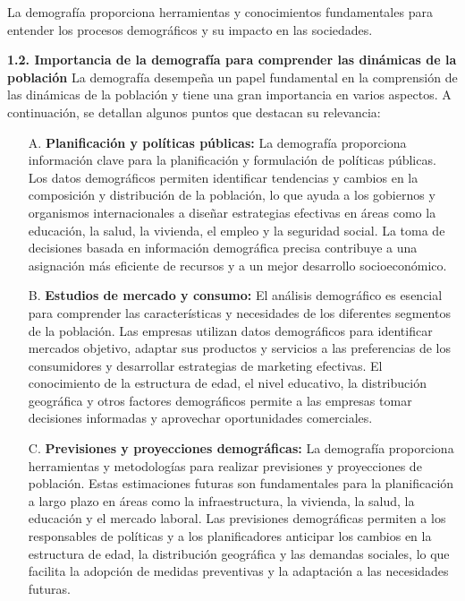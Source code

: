 \documentclass[8pt,a4paper]{beamer}
\begin{document}
{\begin{frame}{}
La demografía proporciona herramientas y conocimientos fundamentales para entender los procesos demográficos y su impacto en las sociedades.
\end{frame}

\begin{frame}{}
\begin{block}{\textbf{1.2. Importancia de la demografía para comprender las dinámicas de la población}}
\justifying
La demografía desempeña un papel fundamental en la comprensión de las dinámicas de la población y tiene una gran importancia en varios aspectos. A continuación, se detallan algunos puntos que destacan su relevancia:
\begin{enumerate}
\justifying
\item[A.] \textbf{Planificación y políticas públicas:} La demografía proporciona información clave para la planificación y formulación de políticas públicas. Los datos demográficos permiten identificar tendencias y cambios en la composición y distribución de la población, lo que ayuda a los gobiernos y organismos internacionales a diseñar estrategias efectivas en áreas como la educación, la salud, la vivienda, el empleo y la seguridad social. La toma de decisiones basada en información demográfica precisa contribuye a una asignación más eficiente de recursos y a un mejor desarrollo socioeconómico.

\item[B.] \textbf{Estudios de mercado y consumo:} El análisis demográfico es esencial para comprender las características y necesidades de los diferentes segmentos de la población. Las empresas utilizan datos demográficos para identificar mercados objetivo, adaptar sus productos y servicios a las preferencias de los consumidores y desarrollar estrategias de marketing efectivas. El conocimiento de la estructura de edad, el nivel educativo, la distribución geográfica y otros factores demográficos permite a las empresas tomar decisiones informadas y aprovechar oportunidades comerciales.
\end{enumerate}
\end{block}
\end{frame}

\begin{frame}{}
\begin{block}{}
\begin{enumerate}
\justifying
\item[C.] \textbf{Previsiones y proyecciones demográficas:} La demografía proporciona herramientas y metodologías para realizar previsiones y proyecciones de población. Estas estimaciones futuras son fundamentales para la planificación a largo plazo en áreas como la infraestructura, la vivienda, la salud, la educación y el mercado laboral. Las previsiones demográficas permiten a los responsables de políticas y a los planificadores anticipar los cambios en la estructura de edad, la distribución geográfica y las demandas sociales, lo que facilita la adopción de medidas preventivas y la adaptación a las necesidades futuras.


\end{enumerate}
\end{block}
\end{frame}}
\end{document}
